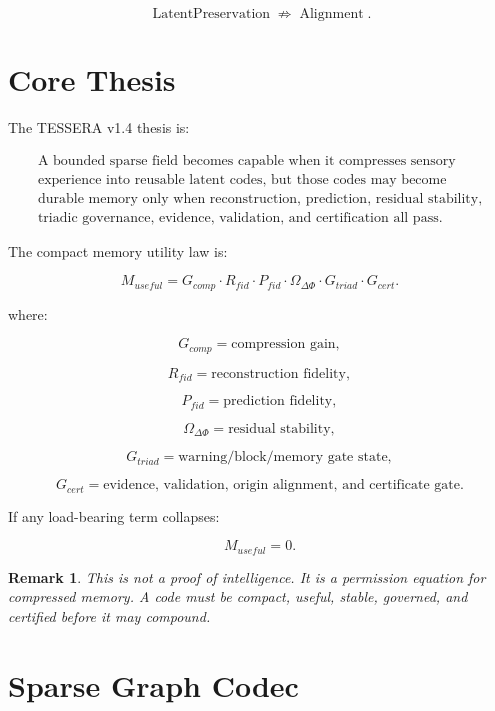 \documentclass[12pt]{article}
\newtheorem{remark}{Remark}
\begin{document}
\[
\operatorname{LatentPreservation}\not\Rightarrow\operatorname{Alignment}.
\]

\section{Core Thesis}

The TESSERA v1.4 thesis is:

\[
\boxed{
\begin{gathered}
\text{A bounded sparse field becomes capable when it compresses sensory}\\
\text{experience into reusable latent codes, but those codes may become}\\
\text{durable memory only when reconstruction, prediction, residual stability,}\\
\text{triadic governance, evidence, validation, and certification all pass.}
\end{gathered}
}
\]

The compact memory utility law is:

\[
\boxed{
M_{useful}
=
G_{comp}\cdot R_{fid}\cdot P_{fid}\cdot \Omega_{\Delta\Phi}\cdot
G_{triad}\cdot G_{cert}.
}
\]

where:

\[
G_{comp}=\text{compression gain},
\]

\[
R_{fid}=\text{reconstruction fidelity},
\]

\[
P_{fid}=\text{prediction fidelity},
\]

\[
\Omega_{\Delta\Phi}=\text{residual stability},
\]

\[
G_{triad}=\text{warning/block/memory gate state},
\]

\[
G_{cert}=\text{evidence, validation, origin alignment, and certificate gate}.
\]

If any load-bearing term collapses:

\[
M_{useful}=0.
\]

\begin{remark}
This is not a proof of intelligence. It is a permission equation for compressed
memory. A code must be compact, useful, stable, governed, and certified before
it may compound.
\end{remark}

\section{Sparse Graph Codec}
\end{document}
